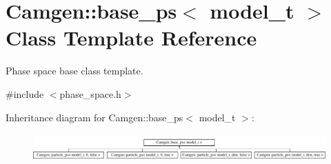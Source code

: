\hypertarget{a00019}{}\section{Camgen\+:\+:base\+\_\+ps$<$ model\+\_\+t $>$ Class Template Reference}
\label{a00019}


Phase space base class template.  




{\ttfamily \#include $<$phase\+\_\+space.\+h$>$}

Inheritance diagram for Camgen\+:\+:base\+\_\+ps$<$ model\+\_\+t $>$\+:\begin{figure}[H]
\begin{center}
\leavevmode
\includegraphics[height=1.056604cm]{a00019}
\end{center}
\end{figure}
